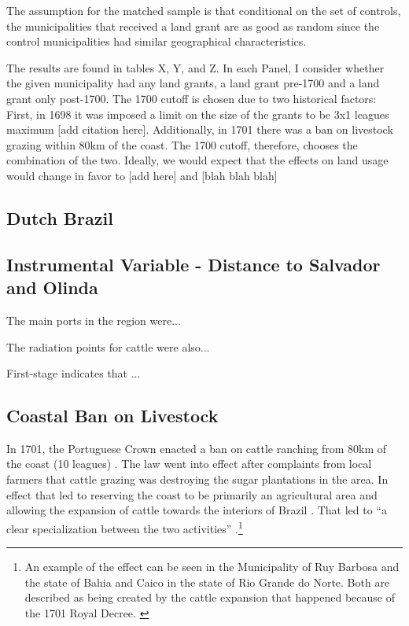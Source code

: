 \documentclass{article}
\begin{document}
The assumption for the matched sample is that conditional on the set of controls, the municipalities that received a land grant are as good as random since the control municipalities had similar geographical characteristics. 

The results are found in tables X, Y, and Z. In each Panel, I consider whether the given municipality had any land grants, a land grant pre-1700 and a land grant only post-1700. The 1700 cutoff is chosen due to two historical factors: First, in 1698 it was imposed a limit on the size of the grants to be 3x1 leagues maximum [add citation here]. Additionally, in 1701 there was a ban on livestock grazing within 80km of the coast. The 1700 cutoff, therefore, chooses the combination of the two. Ideally, we would expect that the effects on land usage would change in favor to [add here] and [blah blah blah] 

\subsection{Dutch Brazil}

\subsection{Instrumental Variable - Distance to Salvador and Olinda}

The main ports in the region were... 

The radiation points for cattle were also...

First-stage indicates that ...

\subsection{Coastal Ban on Livestock}

In 1701, the Portuguese Crown enacted a ban on cattle ranching from 80km of the coast (10 leagues) \parencites[p~.40]{Fausto2014-bh}[p~.198]{Simonsen2005-ps}[p~.460]{Bethell1984-of}. 
The law went into effect after complaints from local farmers that cattle grazing was destroying the sugar plantations in the area. 
In effect that led to reserving the coast to be primarily an agricultural area and allowing the expansion of cattle towards the interiors of Brazil \parencite[p.~216]{Junior1967-jv}.
That led to ``a clear specialization between the two activities'' \parencite{Ribeiro2012-lb}.\footnote{An example of the effect can be seen in the Municipality of Ruy Barbosa and the state of Bahia and Caico in the state of Rio Grande do Norte. Both are described as being created by the cattle expansion that happened because of the 1701 Royal Decree. \parencite{UnknownUnknown-ro}}
\end{document}
